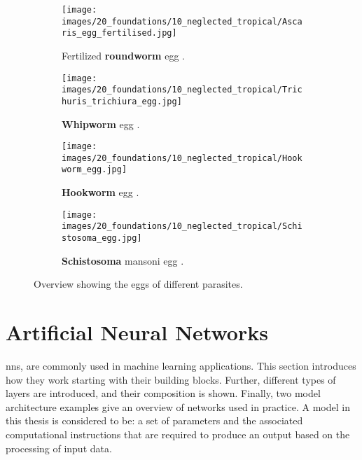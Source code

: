 \begin{figure}[tb]
    \centering
    \begin{subfigure}[t]{0.4\textwidth}
        \centering
        \texttt{[image: images/20\_foundations/10\_neglected\_tropical/Ascaris\_egg\_fertilised.jpg]}
        \caption{Fertilized \textbf{roundworm} egg \cite{dpdx2019ascariasis}.}
        \label{fig:Foundations:NCLs:Diagnosis:Ascaris:Egg}
        \vspace*{2mm}
    \end{subfigure}
    \hspace*{1em}
    \begin{subfigure}[t]{0.4\textwidth}
        \centering
        \texttt{[image: images/20\_foundations/10\_neglected\_tropical/Trichuris\_trichiura\_egg.jpg]}
        \caption{\textbf{Whipworm} egg \cite{dpdx2017trichuriasis}.}
        \label{fig:Foundations:NCLs:Diagnosis:Whipworm:Egg}
        \vspace*{2mm}
    \end{subfigure}

    \begin{subfigure}[t]{0.4\textwidth}
        \centering
        \texttt{[image: images/20\_foundations/10\_neglected\_tropical/Hookworm\_egg.jpg]}
        \caption{\textbf{Hookworm} egg \cite{dpdx2019hookworm}.}
        \label{fig:Foundations:NCLs:Diagnosis:Hookworm:Egg}
    \end{subfigure}
    \hspace*{1em}
    \begin{subfigure}[t]{0.4\textwidth}
        \centering
        \texttt{[image: images/20\_foundations/10\_neglected\_tropical/Schistosoma\_egg.jpg]}
        \caption{\textbf{Schistosoma} mansoni egg \cite{dpdx2019schistosomiasis}.}
        \label{fig:Foundations:NCLs:Diagnosis:Schistosoma:Egg}
    \end{subfigure}
    \caption[Parasite egg overview]{Overview showing the eggs of different parasites.}
    \label{fig:Foundations:NCLs:Diagnosis:Overview}
\end{figure}


\section{Artificial Neural Networks}
\label{sec:Foundations:NeuralNetworks}

\Acfp{nn}, are commonly used in machine learning applications. This section introduces how they work starting with their building blocks. Further, different types of layers are introduced, and their composition is shown. Finally, two model architecture examples give an overview of networks used in practice. A model in this thesis is considered to be: a set of parameters and the associated computational instructions that are required to produce an output based on the processing of input data.


